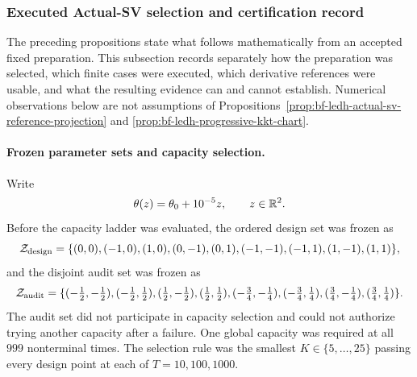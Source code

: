 \subsubsection{Executed Actual-SV selection and certification record}
\label{sec:bf-ledh-actual-sv-overcomplete-certification}

The preceding propositions state what follows mathematically from an accepted
fixed preparation.  This subsection records separately how the preparation was
selected, which finite cases were executed, which derivative references were
usable, and what the resulting evidence can and cannot establish.  Numerical
observations below are not assumptions of
Propositions~\ref{prop:bf-ledh-actual-sv-reference-projection} and
\ref{prop:bf-ledh-progressive-kkt-chart}.

\paragraph{Frozen parameter sets and capacity selection.}
Write
\[
  \theta(z)=\theta_0+10^{-5}z,
  \qquad z\in\mathbb{R}^2.
\]
Before the capacity ladder was evaluated, the ordered design set was frozen as
\begin{equation}
\label{eq:bf-ledh-actual-sv-design-set}
 \mathcal Z_{\rm design}
 =\{(0,0),(-1,0),(1,0),(0,-1),(0,1),
      (-1,-1),(-1,1),(1,-1),(1,1)\},
\end{equation}
and the disjoint audit set was frozen as
\begin{equation}
\label{eq:bf-ledh-actual-sv-heldout-set}
 \mathcal Z_{\rm audit}
 =\{(-\tfrac12,-\tfrac12),(-\tfrac12,\tfrac12),
      (\tfrac12,-\tfrac12),(\tfrac12,\tfrac12),
      (-\tfrac34,-\tfrac14),(-\tfrac34,\tfrac14),
      (\tfrac34,-\tfrac14),(\tfrac34,\tfrac14)\}.
\end{equation}
The audit set did not participate in capacity selection and could not authorize
trying another capacity after a failure.  One global capacity was required at
all \(999\) nonterminal times.  The selection rule was the smallest
\(K\in\{5,\ldots,25\}\) passing every design point at each of
\(T=10,100,1000\).

\begin{table}[H]
\centering
\caption{Frozen Actual-SV anchor-capacity ladder.  A failure is classified by
the first mathematical preparation gate it violates, not by timeout.}
\label{tab:bf-ledh-actual-sv-capacity-ladder}
\end{table}

